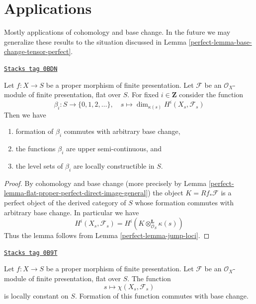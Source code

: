 \section{Applications}
\label{perfect-section-applications}
Mostly applications of cohomology and base change. In the future we may
generalize these results to the situation discussed in
Lemma \ref{perfect-lemma-base-change-tensor-perfect}.

\begin{lemma}
\label{perfect-lemma-jump-loci-geometric}
\href{https://stacks.math.columbia.edu/tag/0BDN}{\texttt{Stacks tag 0BDN}}

Let $f : X \to S$ be a proper morphism of finite presentation.
Let $\mathcal{F}$ be an $\mathcal{O}_X$-module of finite presentation,
flat over $S$. For fixed $i \in \mathbf{Z}$ consider the function
$$
\beta_i : S \to \{0, 1, 2, \ldots\},\quad
s \longmapsto \dim_{\kappa(s)} H^i(X_s, \mathcal{F}_s)
$$
Then we have
\begin{enumerate}
\item formation of $\beta_i$ commutes with arbitrary base change,
\item the functions $\beta_i$ are upper semi-continuous, and
\item the level sets of $\beta_i$ are locally constructible in $S$.
\end{enumerate}
\end{lemma}

\begin{proof}

By cohomology and base change (more precisely by
Lemma \ref{perfect-lemma-flat-proper-perfect-direct-image-general})
the object $K = Rf_*\mathcal{F}$ is a perfect object of the derived
category of $S$ whose formation commutes with arbitrary base change.
In particular we have
$$
H^i(X_s, \mathcal{F}_s) = H^i(K \otimes_{\mathcal{O}_S}^\mathbf{L} \kappa(s))
$$
Thus the lemma follows from
Lemma \ref{perfect-lemma-jump-loci}.
\end{proof}

\begin{lemma}
\label{perfect-lemma-chi-locally-constant-geometric}
\href{https://stacks.math.columbia.edu/tag/0B9T}{\texttt{Stacks tag 0B9T}}

Let $f : X \to S$ be a proper morphism of finite presentation.
Let $\mathcal{F}$ be an $\mathcal{O}_X$-module of finite presentation,
flat over $S$. The function
$$
s \longmapsto \chi(X_s, \mathcal{F}_s)
$$
is locally constant on $S$. Formation of this function commutes with
base change.
\end{lemma}

